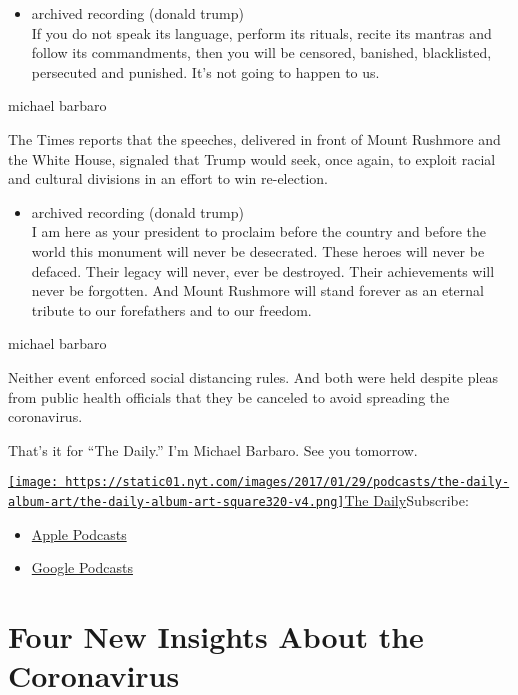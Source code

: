 \begin{itemize}
\tightlist
\item
  archived recording (donald trump)\\
  If you do not speak its language, perform its rituals, recite its
  mantras and follow its commandments, then you will be censored,
  banished, blacklisted, persecuted and punished. It's not going to
  happen to us.
\end{itemize}

michael barbaro

The Times reports that the speeches, delivered in front of Mount
Rushmore and the White House, signaled that Trump would seek, once
again, to exploit racial and cultural divisions in an effort to win
re-election.

\begin{itemize}
\tightlist
\item
  archived recording (donald trump)\\
  I am here as your president to proclaim before the country and before
  the world this monument will never be desecrated. These heroes will
  never be defaced. Their legacy will never, ever be destroyed. Their
  achievements will never be forgotten. And Mount Rushmore will stand
  forever as an eternal tribute to our forefathers and to our freedom.
\end{itemize}

michael barbaro

Neither event enforced social distancing rules. And both were held
despite pleas from public health officials that they be canceled to
avoid spreading the coronavirus.

That's it for ``The Daily.'' I'm Michael Barbaro. See you tomorrow.

\href{https://www.nytimes.com/column/the-daily}{\texttt{[image: https://static01.nyt.com/images/2017/01/29/podcasts/the-daily-album-art/the-daily-album-art-square320-v4.png]}The
Daily}Subscribe:

\begin{itemize}
\tightlist
\item
  \href{https://itunes.apple.com/us/podcast/id1200361736}{Apple
  Podcasts}
\item
  \href{https://www.google.com/podcasts?feed=aHR0cHM6Ly9yc3MuYXJ0MTkuY29tL3RoZS1kYWlseQ\%3D\%3D}{Google
  Podcasts}
\end{itemize}

\hypertarget{four-new-insights-about-the-coronavirus-1}{%
\section{Four New Insights About the
Coronavirus}\label{four-new-insights-about-the-coronavirus-1}}

